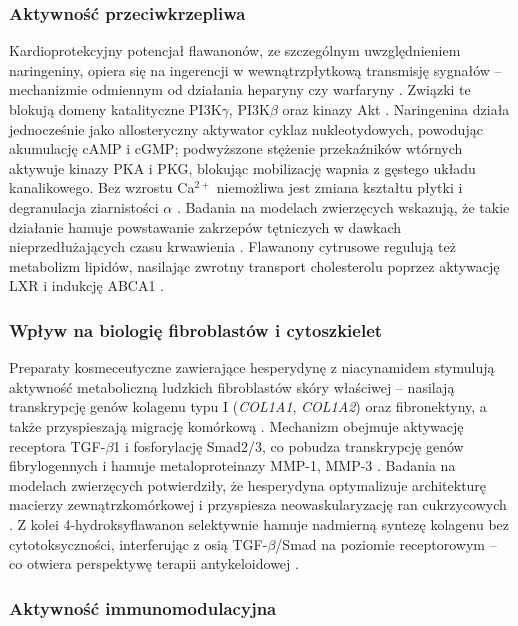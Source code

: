 \documentclass[12pt,a4paper]{article}
\begin{document}
\subsubsection{Aktywność przeciwkrzepliwa}

Kardioprotekcyjny potencjał flawanonów, ze szczególnym uwzględnieniem naringeniny, opiera się na ingerencji w wewnątrzpłytkową transmisję sygnałów -- mechanizmie odmiennym od działania heparyny czy warfaryny \cite{tamer2022}. Związki te blokują domeny katalityczne PI3K$\gamma$, PI3K$\beta$ oraz kinazy Akt \cite{huang2021}. Naringenina działa jednocześnie jako allosteryczny aktywator cyklaz nukleotydowych, powodując akumulację cAMP i cGMP; podwyższone stężenie przekaźników wtórnych aktywuje kinazy PKA i PKG, blokując mobilizację wapnia z gęstego układu kanalikowego. Bez wzrostu Ca\(^{2+}\) niemożliwa jest zmiana kształtu płytki i degranulacja ziarnistości $\alpha$ \cite{huang2021}. Badania na modelach zwierzęcych wskazują, że takie działanie hamuje powstawanie zakrzepów tętniczych w dawkach nieprzedłużających czasu krwawienia \cite{huang2021}. Flawanony cytrusowe regulują też metabolizm lipidów, nasilając zwrotny transport cholesterolu poprzez aktywację LXR i indukcję ABCA1 \cite{yang2022}.

\subsubsection{Wpływ na biologię fibroblastów i cytoszkielet}

Preparaty kosmeceutyczne zawierające hesperydynę z niacynamidem stymulują aktywność metaboliczną ludzkich fibroblastów skóry właściwej -- nasilają transkrypcję genów kolagenu typu I (\textit{COL1A1}, \textit{COL1A2}) oraz fibronektyny, a także przyspieszają migrację komórkową \cite{wessels2012}. Mechanizm obejmuje aktywację receptora TGF-$\beta$1 i fosforylację Smad2/3, co pobudza transkrypcję genów fibrylogennych i hamuje metaloproteinazy MMP-1, MMP-3 \cite{wessels2012}. Badania na modelach zwierzęcych potwierdziły, że hesperydyna optymalizuje architekturę macierzy zewnątrzkomórkowej i przyspiesza neowaskularyzację ran cukrzycowych \cite{namdar2025}. Z kolei 4-hydroksyflawanon selektywnie hamuje nadmierną syntezę kolagenu bez cytotoksyczności, interferując z osią TGF-$\beta$/Smad na poziomie receptorowym -- co otwiera perspektywę terapii antykeloidowej \cite{stipcevic2006}.

\subsubsection{Aktywność immunomodulacyjna}
\end{document}
